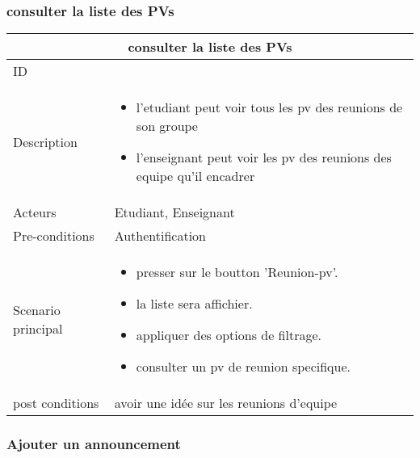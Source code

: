\documentclass[11pt,fleqn]{book} %
\begin{document}
\subsubsection{consulter la liste des PVs}
\begin{center}
\begin{tabularx}{1\textwidth} { | p{4cm} | >{\raggedright\arraybackslash}X |  }
  \hline
  \multicolumn{2}{|c|}{consulter la liste des PVs} \\
 \hline
 ID & 1  \\
 \hline
 Description  &  
 \begin{itemize}
     \item l'etudiant peut voir tous les pv des reunions de son groupe
     \item l'enseignant peut voir les pv des reunions des equipe qu'il encadrer
 \end{itemize}
 \\
  \hline
 Acteurs  & Etudiant, Enseignant   \\
  \hline
 Pre-conditions  & Authentification\\
 \hline
 Scenario principal  &  
 \begin{itemize}
     \item presser sur le boutton ’Reunion-pv’.
     \item la liste sera affichier.
     \item appliquer des options de filtrage.
     \item consulter un pv de reunion specifique.
 \end{itemize}\\
  \hline
 post conditions  & avoir une idée sur les reunions d'equipe  \\
  \hline
\end{tabularx}
\label{tbl:nicetablelesstable}
\end{center}
\subsubsection{Ajouter un announcement}
\end{document}
